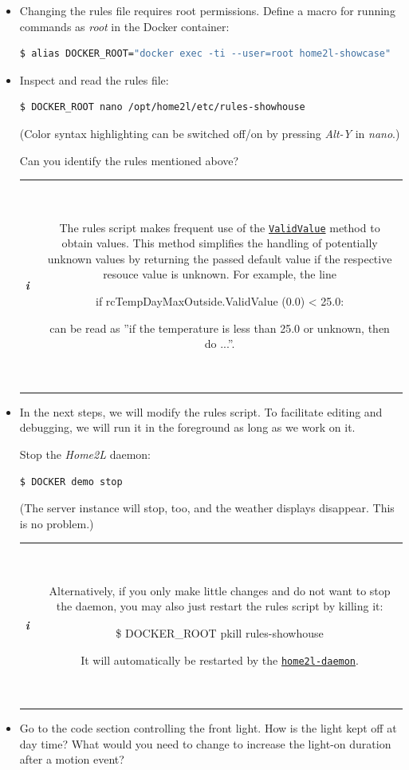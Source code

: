 \documentclass[12pt,english,parskip=half,headheight=19pt]{scrreprt}
\newcommand{\lstbox}[1]{
  \par
  \colorbox{lstbackground}{\ttfamily\footnotesize{\parbox{\linewidth}{#1}}}
  \par
}
\newcommand{\infobox}[1]{
  \par
  \medskip
  \hfill
  \setlength\arrayrulewidth{1pt}
  \begin{tabular}[t]{c|c|}
    \parbox{1.8em}{\hfill\textit{\Huge\textbf{i}\,}}
    &
    \,\parbox{0.89\linewidth}{\setlength{\parskip}{0.5em} \small #1}\,
  \end{tabular}
  \medskip
  \par
}
\newcommand{\idx}[1]{#1\index{#1}}
\newcommand{\reftool}[1]{\hyperref[tool:#1]{\texttt{\idx{#1}}}}
\newcommand{\refapipython}[1]{\href{home2l-api_python/index.html}{\mbox{\texttt{#1}}}}  %
\begin{document}
\begin{itemize}[$\blacktriangleright$]

\item
  Changing the rules file requires root permissions. Define a macro for running commands as
  \textit{root} in the Docker container:
  \begin{lstlisting}[language=bash]
    $ alias DOCKER_ROOT="docker exec -ti --user=root home2l-showcase"
  \end{lstlisting}

\item
  Inspect and read the rules file:
  \begin{lstlisting}[language=bash]
    $ DOCKER_ROOT nano /opt/home2l/etc/rules-showhouse
  \end{lstlisting}

  (Color syntax highlighting can be switched off/on by pressing \textit{Alt-Y} in \textit{nano}.)

  Can you identify the rules mentioned above?

  \infobox{
    The rules script makes frequent use of the \refapipython{ValidValue} method to obtain values.
    This method simplifies the handling of potentially unknown values by returning the passed
    default value if the respective resouce value is unknown. For example, the line
    \lstbox{if rcTempDayMaxOutside.ValidValue (0.0) < 25.0:}
    can be read as ''if the temperature is less than 25.0 or unknown, then do ...''.
  }

\item
  In the next steps, we will modify the rules script. To facilitate editing and debugging,
  we will run it in the foreground as long as we work on it.
  
  Stop the \textit{Home2L} daemon:
  \begin{lstlisting}[language=bash]
    $ DOCKER demo stop
  \end{lstlisting}

  (The server instance will stop, too, and the weather displays disappear. This is no problem.)

  \infobox{
    Alternatively, if you only make little changes and do not want to stop the daemon,
    you may also just restart the rules script by killing it:
    \lstbox{\$ DOCKER\_ROOT pkill rules-showhouse}
    It will automatically be restarted by the \reftool{home2l-daemon}.
  }

\item
  Go to the code section controlling the front light.
  How is the light kept off at day time?
  What would you need to change to increase the light-on duration after a motion event?


\end{itemize}
\end{document}
